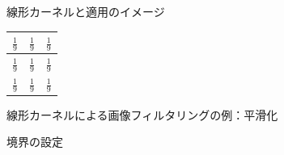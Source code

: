 \documentclass[10pt]{beamer}
\begin{document}
	\begin{frame}{線形カーネルと適用のイメージ}
		\begin{center}
			\begin{tabular}{|c|c|c|}\hline
				$\frac{1}{9}$ & $\frac{1}{9}$ & $\frac{1}{9}$ \\ \hline
				$\frac{1}{9}$ & $\frac{1}{9}$ & $\frac{1}{9}$ \\ \hline
				$\frac{1}{9}$ & $\frac{1}{9}$ & $\frac{1}{9}$ \\ \hline
			\end{tabular}
		\end{center}
	\end{frame}

	\begin{frame}{線形カーネルによる画像フィルタリングの例：平滑化}

	\end{frame}
	
	\begin{frame}{境界の設定}
		
	\end{frame}
\end{document}
